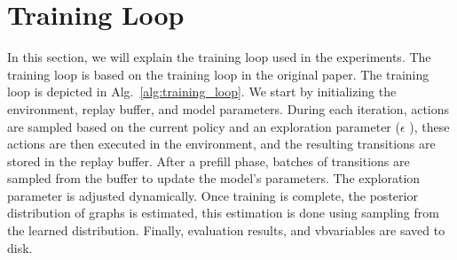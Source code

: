 \documentclass{lxaiproposal}
\begin{document}
    \section{Training Loop}\label{app:training_loop}
    \vspace*{-3mm}

    In this section, we will explain the training loop used in the experiments. The training loop is based on the
    training loop in the original paper. The training loop is depicted in Alg.~\ref{alg:training_loop}.
    We start by initializing the environment, replay buffer, and model parameters.
    During each iteration, actions are sampled based on the current policy and an exploration parameter ($\epsilon$
    ), these actions are then executed in the environment, and the resulting transitions are stored in the replay
    buffer. After a prefill
    phase, batches of transitions are sampled from the buffer to update the model's parameters. The exploration
    parameter is adjusted dynamically. Once training is complete, the posterior distribution of graphs is estimated,
    this estimation is done using sampling from the learned distribution. Finally, evaluation results, and
    vbvariables are saved to disk.
\end{document}
